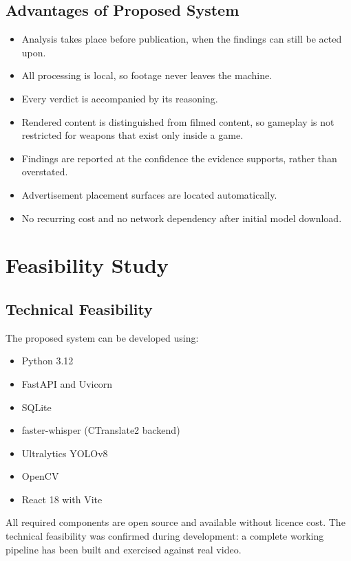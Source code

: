 \documentclass[12pt,a4paper,twoside]{report}
\begin{document}
\subsection{Advantages of Proposed System}

\begin{itemize}
\item Analysis takes place before publication, when the findings can still be acted upon.
\item All processing is local, so footage never leaves the machine.
\item Every verdict is accompanied by its reasoning.
\item Rendered content is distinguished from filmed content, so gameplay is not restricted for weapons that exist only inside a game.
\item Findings are reported at the confidence the evidence supports, rather than overstated.
\item Advertisement placement surfaces are located automatically.
\item No recurring cost and no network dependency after initial model download.
\end{itemize}

\section{Feasibility Study}

\subsection{Technical Feasibility}

The proposed system can be developed using:

\begin{itemize}
\item Python 3.12
\item FastAPI and Uvicorn
\item SQLite
\item faster-whisper (CTranslate2 backend)
\item Ultralytics YOLOv8
\item OpenCV
\item React 18 with Vite
\end{itemize}

All required components are open source and available without licence cost. The technical feasibility was confirmed during development: a complete working pipeline has been built and exercised against real video.
\end{document}
